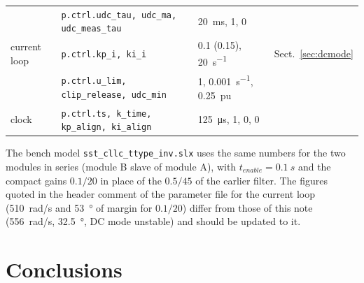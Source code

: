 \documentclass[10pt,a4paper]{scrartcl}
\newcommand{\code}[1]{\texttt{#1}}
\begin{document}
\begin{onehalfspace}
\begin{table}[htb]
\begin{tabular}{@{}llll@{}}
 & \code{p.ctrl.udc\_tau, udc\_ma, udc\_meas\_tau} & \SI{20}{ms}, 1, 0 & \\
current loop & \code{p.ctrl.kp\_i, ki\_i} & 0.1 (0.15), \SI{20}{s^{-1}} & Sect.~\ref{sec:dcmode} \\
 & \code{p.ctrl.u\_lim, clip\_release, udc\_min} & 1, \SI{0.001}{s^{-1}}, \SI{0.25}{pu} & \\
clock & \code{p.ctrl.ts, k\_time, kp\_align, ki\_align} & \SI{125}{\micro s}, 1, 0, 0 & \\
\bottomrule
\end{tabular}
\end{table}

The bench model \code{sst\_cllc\_ttype\_inv.slx} uses the same numbers for the two modules in series (module B slave of module A), with $t_{enable} = \SI{0.1}{s}$ and the compact gains $0.1/20$ in place of the $0.5/45$ of the earlier filter. The figures quoted in the header comment of the parameter file for the current loop (\SI{510}{rad/s} and \SI{53}{\degree} of margin for $0.1/20$) differ from those of this note (\SI{556}{rad/s}, \SI{32.5}{\degree}, DC mode unstable) and should be updated to it.

\section{Conclusions}


\end{onehalfspace}
\end{document}
